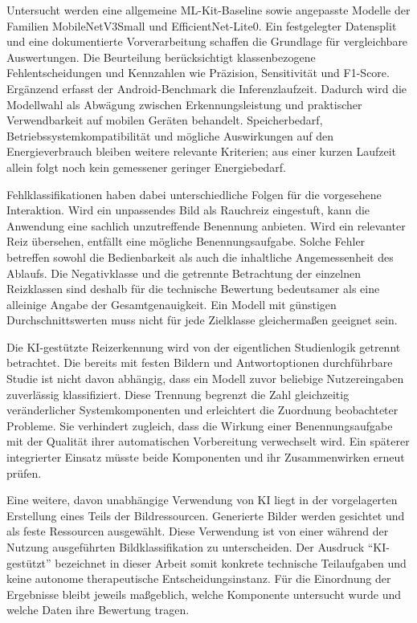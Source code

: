 Untersucht werden eine allgemeine ML-Kit-Baseline sowie angepasste Modelle der Familien MobileNetV3Small und EfficientNet-Lite0. Ein festgelegter Datensplit und eine dokumentierte Vorverarbeitung schaffen die Grundlage für vergleichbare Auswertungen. Die Beurteilung berücksichtigt klassenbezogene Fehlentscheidungen und Kennzahlen wie Präzision, Sensitivität und F1-Score. Ergänzend erfasst der Android-Benchmark die Inferenzlaufzeit. Dadurch wird die Modellwahl als Abwägung zwischen Erkennungsleistung und praktischer Verwendbarkeit auf mobilen Geräten behandelt. Speicherbedarf, Betriebssystemkompatibilität und mögliche Auswirkungen auf den Energieverbrauch bleiben weitere relevante Kriterien; aus einer kurzen Laufzeit allein folgt noch kein gemessener geringer Energiebedarf.

Fehlklassifikationen haben dabei unterschiedliche Folgen für die vorgesehene Interaktion. Wird ein unpassendes Bild als Rauchreiz eingestuft, kann die Anwendung eine sachlich unzutreffende Benennung anbieten. Wird ein relevanter Reiz übersehen, entfällt eine mögliche Benennungsaufgabe. Solche Fehler betreffen sowohl die Bedienbarkeit als auch die inhaltliche Angemessenheit des Ablaufs. Die Negativklasse und die getrennte Betrachtung der einzelnen Reizklassen sind deshalb für die technische Bewertung bedeutsamer als eine alleinige Angabe der Gesamtgenauigkeit. Ein Modell mit günstigen Durchschnittswerten muss nicht für jede Zielklasse gleichermaßen geeignet sein.

Die KI-gestützte Reizerkennung wird von der eigentlichen Studienlogik getrennt betrachtet. Die bereits mit festen Bildern und Antwortoptionen durchführbare Studie ist nicht davon abhängig, dass ein Modell zuvor beliebige Nutzereingaben zuverlässig klassifiziert. Diese Trennung begrenzt die Zahl gleichzeitig veränderlicher Systemkomponenten und erleichtert die Zuordnung beobachteter Probleme. Sie verhindert zugleich, dass die Wirkung einer Benennungsaufgabe mit der Qualität ihrer automatischen Vorbereitung verwechselt wird. Ein späterer integrierter Einsatz müsste beide Komponenten und ihr Zusammenwirken erneut prüfen.

Eine weitere, davon unabhängige Verwendung von KI liegt in der vorgelagerten Erstellung eines Teils der Bildressourcen. Generierte Bilder werden gesichtet und als feste Ressourcen ausgewählt. Diese Verwendung ist von einer während der Nutzung ausgeführten Bildklassifikation zu unterscheiden. Der Ausdruck \enquote{KI-gestützt} bezeichnet in dieser Arbeit somit konkrete technische Teilaufgaben und keine autonome therapeutische Entscheidungsinstanz. Für die Einordnung der Ergebnisse bleibt jeweils maßgeblich, welche Komponente untersucht wurde und welche Daten ihre Bewertung tragen.

